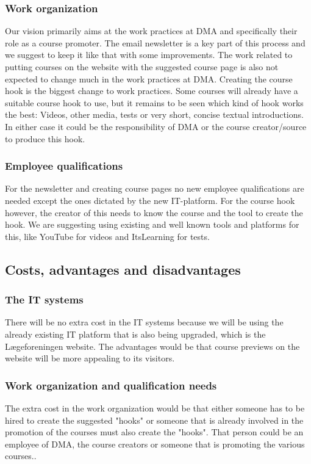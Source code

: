 \subsubsection{Work organization}
Our vision primarily aims at the work practices at DMA and specifically their role as a course promoter. The email newsletter is a key part of this process and we suggest to keep it like that with some improvements. The work related to putting courses on the website with the suggested course page is also not expected to change much in the work practices at DMA.
Creating the course hook is the biggest change to work practices. Some courses will already have a suitable course hook to use, but it remains to be seen which kind of hook works the best: Videos, other media, tests or very short, concise textual introductions. In either case it could be the responsibility of DMA or the course creator/source to produce this hook.

\subsubsection{Employee qualifications}
For the newsletter and creating course pages no new employee qualifications are needed except the ones dictated by the new IT-platform. For the course hook however, the creator of this needs to know the course and the tool to create the hook. We are suggesting using existing and well known tools and platforms for this, like YouTube for videos and ItsLearning for tests.

\subsection{Costs, advantages and disadvantages}
\subsubsection{The IT systems}
There will be no extra cost in the IT systems because we will be using the already existing IT platform that is also being upgraded, which is the Lægeforeningen website. The advantages would be that course previews on the website will be more appealing to its visitors.

\subsubsection{Work organization and qualification needs}
The extra cost in the work organization would be that either someone has to be hired to create the suggested "hooks" or someone that is already involved in the promotion of the courses must also create the "hooks". That person could be an employee of DMA, the course creators or someone that is promoting the various courses..

